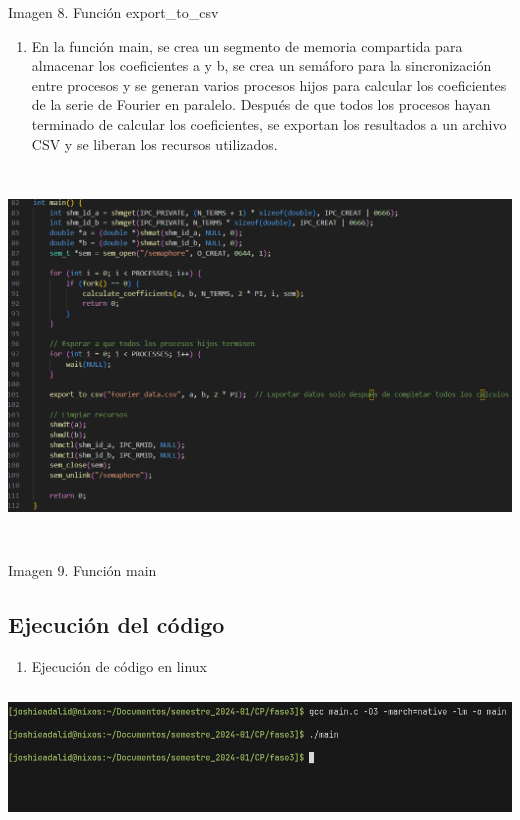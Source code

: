 Imagen 8. Función export\_to\_csv

\begin{enumerate} \def\labelenumi{\arabic{enumi}.} \setcounter{enumi}{4} \item   En la función main, se crea un segmento de memoria compartida para   almacenar los coeficientes a y b, se crea un semáforo para la   sincronización entre procesos y se generan varios procesos hijos para   calcular los coeficientes de la serie de Fourier en paralelo. Después   de que todos los procesos hayan terminado de calcular los   coeficientes, se exportan los resultados a un archivo CSV y se liberan   los recursos utilizados. \end{enumerate}

\includegraphics[width=6.26772in,height=3.90278in]{media/image7.png}

Imagen 9. Función main

\subsection{\texorpdfstring{Ejecución del código }{Ejecución del código }}\label{ejecuciuxf3n-del-cuxf3digo}

\begin{enumerate} \def\labelenumi{\arabic{enumi}.} \item   Ejecución de código en linux \end{enumerate}

\includegraphics[width=6.26772in,height=1.375in]{media/image29.png}

